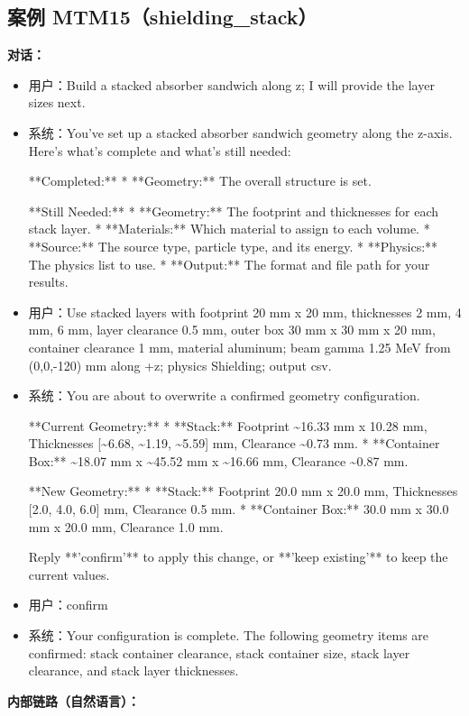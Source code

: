 \documentclass[11pt]{ctexart}
\begin{document}
\subsection{案例 MTM15（shielding\_stack）}
\textbf{对话：}
\begin{itemize}
\item 用户：Build a stacked absorber sandwich along z; I will provide the layer sizes next.
\item 系统：You've set up a stacked absorber sandwich geometry along the z-axis. Here's what's complete and what's still needed:

**Completed:**
*   **Geometry:** The overall structure is set.

**Still Needed:**
*   **Geometry:** The footprint and thicknesses for each stack layer.
*   **Materials:** Which material to assign to each volume.
*   **Source:** The source type, particle type, and its energy.
*   **Physics:** The physics list to use.
*   **Output:** The format and file path for your results.
\item 用户：Use stacked layers with footprint 20 mm x 20 mm, thicknesses 2 mm, 4 mm, 6 mm, layer clearance 0.5 mm, outer box 30 mm x 30 mm x 20 mm, container clearance 1 mm, material aluminum; beam gamma 1.25 MeV from (0,0,-120) mm along +z; physics Shielding; output csv.
\item 系统：You are about to overwrite a confirmed geometry configuration.

**Current Geometry:**
*   **Stack:** Footprint \textasciitilde{}16.33 mm x 10.28 mm, Thicknesses [\textasciitilde{}6.68, \textasciitilde{}1.19, \textasciitilde{}5.59] mm, Clearance \textasciitilde{}0.73 mm.
*   **Container Box:** \textasciitilde{}18.07 mm x \textasciitilde{}45.52 mm x \textasciitilde{}16.66 mm, Clearance \textasciitilde{}0.87 mm.

**New Geometry:**
*   **Stack:** Footprint 20.0 mm x 20.0 mm, Thicknesses [2.0, 4.0, 6.0] mm, Clearance 0.5 mm.
*   **Container Box:** 30.0 mm x 30.0 mm x 20.0 mm, Clearance 1.0 mm.

Reply **'confirm'** to apply this change, or **'keep existing'** to keep the current values.
\item 用户：confirm
\item 系统：Your configuration is complete. The following geometry items are confirmed: stack container clearance, stack container size, stack layer clearance, and stack layer thicknesses.
\end{itemize}
\textbf{内部链路（自然语言）：}
\end{document}
